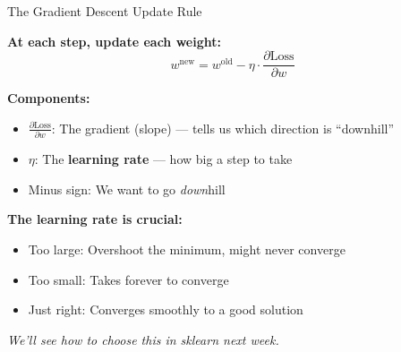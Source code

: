 \documentclass[10pt]{beamer}
\newcommand{\highlight}[1]{\textcolor{AccentOrange}{\textbf{#1}}}
\begin{document}
\begin{frame}{The Gradient Descent Update Rule}

  \textbf{At each step, update each weight:}
  \[
  w^{\text{new}} = w^{\text{old}} - \eta \cdot \frac{\partial \text{Loss}}{\partial w}
  \]

  \vspace{0.5em}
  \textbf{Components:}
  \begin{itemize}
    \item $\frac{\partial \text{Loss}}{\partial w}$: The gradient (slope) --- tells us which direction is ``downhill''
    \item $\eta$: The \highlight{learning rate} --- how big a step to take
    \item Minus sign: We want to go \textit{down}hill
  \end{itemize}

  \vspace{1em}
  \textbf{The learning rate is crucial:}
  \begin{itemize}
    \item Too large: Overshoot the minimum, might never converge
    \item Too small: Takes forever to converge
    \item Just right: Converges smoothly to a good solution
  \end{itemize}

  \vspace{0.3em}
  \textit{We'll see how to choose this in sklearn next week.}
\end{frame}

\end{document}
